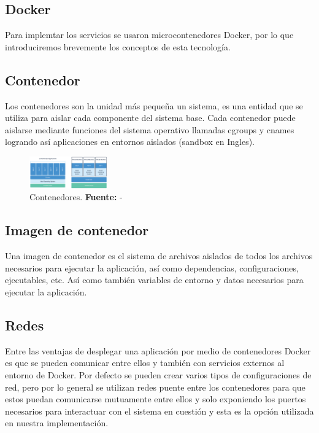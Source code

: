 \subsection{Docker}

Para implemtar los servicios se usaron microcontenedores Docker, por lo que introduciremos
brevemente los conceptos de esta tecnología.

\subsection{Contenedor}

Los contenedores son la unidad más pequeña un sistema, es una entidad que se utiliza para aislar
cada componente del sistema base. Cada contenedor puede aislarse mediante funciones del sistema
operativo llamadas cgroups y cnames logrando así aplicaciones en entornos aislados (sandbox en
Ingles). \cite{Docker}
\begin{figure}[H]
\begin{centering}
\includegraphics[angle=0,width=0.3\textwidth]{Figuras/docker-container.png}
\par \end{centering}
\caption[Contenedores]{Contenedores. \textbf{Fuente:} -}
\label{Contenedores}
\end{figure}

\subsection{Imagen de contenedor}
Una imagen de contenedor es el sistema de archivos aislados de todos los archivos necesarios para
ejecutar la aplicación, así como dependencias, configuraciones, ejecutables, etc. Así como también
variables de entorno y datos necesarios para ejecutar la aplicación. \cite{Docker}

\subsection{Redes}
Entre las ventajas de desplegar una aplicación por medio de contenedores Docker es que se pueden
comunicar entre ellos y también con servicios externos al entorno de Docker. Por defecto se pueden
crear varios tipos de configuraciones de red, pero por lo general se utilizan redes puente entre
los contenedores para que estos puedan comunicarse mutuamente entre ellos y solo exponiendo los
puertos necesarios para interactuar con el sistema en cuestión y esta es la opción utilizada en
nuestra implementación. \cite{Docker}

